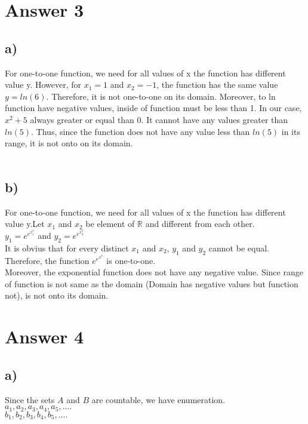 \documentclass[12pt]{article}
\begin{document}
	




\section*{Answer 3}

\subsection*{a)} 

For one-to-one function, we need for all values of x the function has different value y. However, for $x_1=1$ and $x_2=-1$, the function has the same value $y = ln(6)$.   Therefore, it is not one-to-one on its domain. Moreover, to ln function have negative values, inside of function must be less than 1. In our case, $x^2+5$ always greater or equal than $0$. It cannot have any values greater than $ln(5)$. Thus, since the function does not have any value less than $ln(5)$ in its range, it is not onto on its domain.\\
\\
\subsection*{b)}

For one-to-one function, we need for all values of x the function has different value y.Let $x_1$ and $x_2$ be element of $\mathbb{R}$ and different from each other. \\

$y_1 = e^{e^{x_1^7}}$ and $y_2 = e^{e^{x_2^7}}$ \\

It is obvius that for every distinct $x_1$ and $x_2$, $y_1$ and $y_2$ cannot be equal.
Therefore, the function $e^{e^{x^7}}$ is one-to-one. \\
Moreover, the exponential function does not have any negative value. Since range of function is not same as the domain (Domain has negative values but function not), is not onto its domain.


\section*{Answer 4}
\subsection*{a)}

Since the sets $A$ and $B$ are countable, we have enumeration. \\
${a_1,a_2,a_3,a_4,a_5,....}$ \\
${b_1,b_2,b_3,b_4,b_5,....}$ \\
\end{document}

